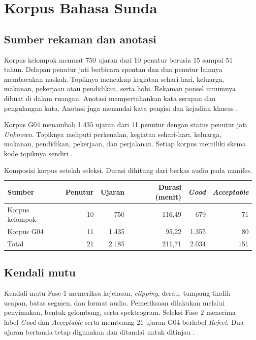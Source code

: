 \chapter{Korpus Bahasa Sunda}
\label{bab:korpus}

\section{Sumber rekaman dan anotasi}

Korpus kelompok memuat 750 ujaran dari 10 penutur berusia 15 sampai 51 tahun. Delapan penutur jati berbicara spontan dan dua penutur lainnya membacakan naskah. Topiknya mencakup kegiatan sehari-hari, keluarga, makanan, pekerjaan atau pendidikan, serta hobi. Rekaman ponsel umumnya dibuat di dalam ruangan. Anotasi mempertahankan kata serapan dan pengulangan kata. Anotasi juga menandai kata pengisi dan kejadian khusus \cite{fase1,korpusutama}.

Korpus G04 menambah 1.435 ujaran dari 11 penutur dengan status penutur jati \textit{Unknown}. Topiknya meliputi perkenalan, kegiatan sehari-hari, keluarga, makanan, pendidikan, pekerjaan, dan perjalanan. Setiap korpus memiliki skema kode topiknya sendiri \cite{korpusg04,repoasr}.

\begin{table}[!htbp]
  \centering\small
  \caption{Komposisi korpus setelah seleksi. Durasi dihitung dari berkas audio pada manifes.}
  \label{tab:korpus}
  \begin{tabular}{@{}lrrrrr@{}}
    \toprule
    Sumber & Penutur & Ujaran & Durasi (menit) & \textit{Good} & \textit{Acceptable} \\
    \midrule
    Korpus kelompok & 10 & 750 & 116,49 & 679 & 71 \\
    Korpus G04 & 11 & 1.435 & 95,22 & 1.355 & 80 \\
    \midrule
    Total & 21 & 2.185 & 211,71 & 2.034 & 151 \\
    \bottomrule
  \end{tabular}
\end{table}

\section{Kendali mutu}

Kendali mutu Fase 1 memeriksa kejelasan, \textit{clipping}, derau, tumpang tindih ucapan, batas segmen, dan format audio. Pemeriksaan dilakukan melalui penyimakan, bentuk gelombang, serta spektrogram. Seleksi Fase 2 menerima label \textit{Good} dan \textit{Acceptable} serta membuang 21 ujaran G04 berlabel \textit{Reject}. Dua ujaran bertanda \kode{[unclear]} tetap digunakan dan ditandai untuk ditinjau \cite{fase1,korpusg04,repoasr}.

